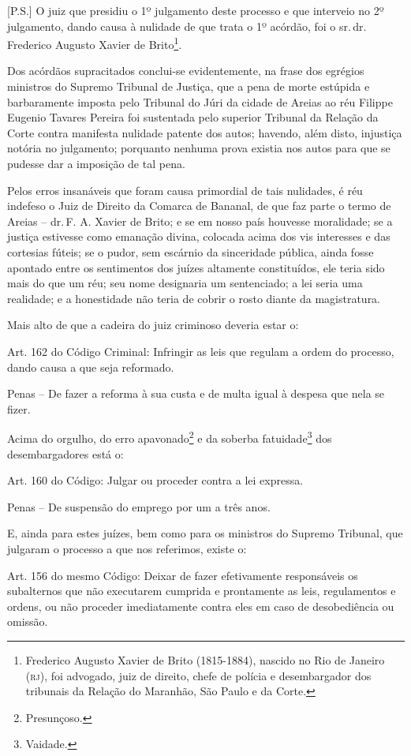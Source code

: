 {[}P.S.{]} O juiz que presidiu o 1º julgamento deste processo e que
interveio no 2º julgamento, dando causa à nulidade de que trata o 1º
acórdão, foi o sr.\,dr.\,Frederico Augusto Xavier de Brito\footnote{
  Frederico Augusto Xavier de Brito (1815-1884), nascido no Rio de
  Janeiro (\textsc{rj}), foi advogado, juiz de direito, chefe de polícia e
  desembargador dos tribunais da Relação do Maranhão, São Paulo e da
  Corte.}.

Dos acórdãos supracitados conclui-se evidentemente, na frase dos
egrégios ministros do Supremo Tribunal de Justiça, que a pena de morte
estúpida e barbaramente imposta pelo Tribunal do Júri da cidade de
Areias ao réu Filippe Eugenio Tavares Pereira foi sustentada pelo
superior Tribunal da Relação da Corte contra manifesta nulidade patente
dos autos; havendo, além disto, injustiça notória no julgamento;
porquanto nenhuma prova existia nos autos para que se pudesse dar a
imposição de tal pena.

Pelos erros insanáveis que foram causa primordial de tais nulidades, é
réu indefeso o Juiz de Direito da Comarca de Bananal, de que faz parte o
termo de Areias -- dr.\,F. A. Xavier de Brito; e se em nosso país
houvesse moralidade; se a justiça estivesse como emanação divina,
colocada acima dos vis interesses e das cortesias fúteis; se o pudor,
sem escárnio da sinceridade pública, ainda fosse apontado entre os
sentimentos dos juízes altamente constituídos, ele teria sido mais do
que um réu; seu nome designaria um sentenciado; a lei seria uma
realidade; e a honestidade não teria de cobrir o rosto diante da
magistratura.

Mais alto de que a cadeira do juiz criminoso deveria estar o:

Art. 162 do Código Criminal: Infringir as leis que regulam a ordem do
processo, dando causa a que seja reformado.

Penas -- De fazer a reforma à sua custa e de multa igual à despesa que
nela se fizer.

Acima do orgulho, do erro apavonado\footnote{Presunçoso.} e da soberba
fatuidade\footnote{Vaidade.} dos desembargadores está o:

Art. 160 do Código: Julgar ou proceder contra a lei expressa.

Penas -- De suspensão do emprego por um a três anos.

E, ainda para estes juízes, bem como para os ministros do Supremo
Tribunal, que julgaram o processo a que nos referimos, existe o:

Art. 156 do mesmo Código: Deixar de fazer efetivamente responsáveis os
subalternos que não executarem cumprida e prontamente as leis,
regulamentos e ordens, ou não proceder imediatamente contra eles em caso
de desobediência ou omissão.

